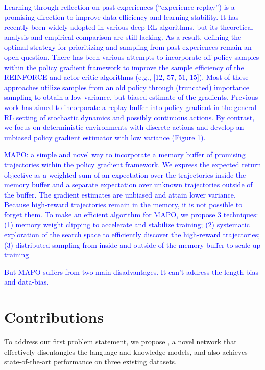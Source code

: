 \textcolor{blue}{Learning through reflection on past experiences (“experience replay”) is a promising direction to improve data efficiency and learning stability. It has recently been widely adopted in various deep RL algorithms, but its theoretical analysis and empirical comparison are still lacking. As a result, defining the optimal strategy for prioritizing and sampling from past experiences remain an open question. There has been various attempts to incorporate off-policy samples within the policy gradient framework to improve the sample efficiency of the REINFORCE and actor-critic algorithms (e.g., [12, 57, 51, 15]). Most of these approaches utilize samples from an old policy through (truncated) importance sampling to obtain a low variance, but biased estimate of the gradients. Previous work has aimed to incorporate a replay buffer into policy gradient in the general RL setting of stochastic dynamics and possibly continuous actions. By contrast, we focus on deterministic environments with discrete actions and develop an unbiased policy gradient estimator with low variance (Figure 1).}

\textcolor{blue}{MAPO: a simple and novel way to incorporate a memory buffer of promising trajectories within the policy gradient framework. We express the expected return objective as a weighted sum of an expectation over the trajectories inside the memory buffer and a separate expectation over unknown trajectories outside of the buffer. The gradient estimates are unbiased and attain lower variance. Because high-reward trajectories remain in the memory, it is not possible to forget them. To make an efficient algorithm for MAPO, we propose 3 techniques: (1) memory weight clipping to accelerate and stabilize training; (2) systematic exploration of the search space to efficiently discover the high-reward trajectories; (3) distributed sampling from inside and outside of the memory buffer to scale up training}

\textcolor{blue}{But MAPO suffers from two main disadvantages. It can't address the length-bias and data-bias.}

\section{Contributions}

To address our first problem statement, we propose \sys, a novel network that effectively disentangles the language and knowledge models, and also achieves state-of-the-art performance on three existing datasets. 

